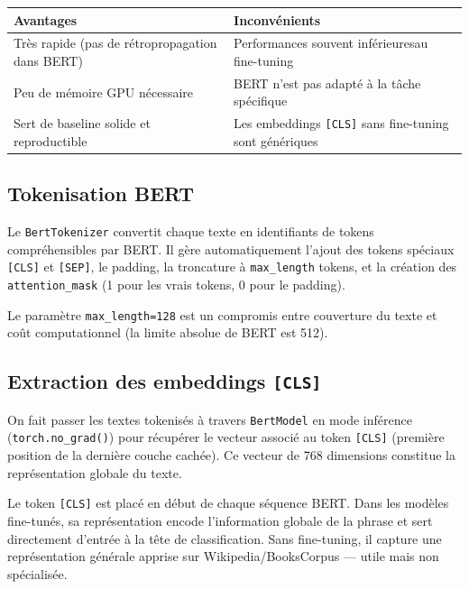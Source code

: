 \documentclass[12pt,a4paper]{article}
\begin{document}
\begin{center}
\begin{tabular}{@{}L{7.5cm}L{7.5cm}@{}}
  \toprule
  Avantages & Inconvénients \\
  \midrule
  Très rapide (pas de rétropropagation dans BERT) & Performances souvent inférieures\newline au fine-tuning \\
  Peu de mémoire GPU nécessaire & BERT n'est pas adapté à la tâche spécifique \\
  Sert de baseline solide et reproductible & Les embeddings \texttt{[CLS]} sans fine-tuning sont génériques \\
  \bottomrule
\end{tabular}
\end{center}

\subsection{Tokenisation BERT}

Le \texttt{BertTokenizer} convertit chaque texte en identifiants de tokens compréhensibles
par BERT. Il gère automatiquement l'ajout des tokens spéciaux \texttt{[CLS]} et
\texttt{[SEP]}, le padding, la troncature à \texttt{max\_length} tokens, et la création des
\texttt{attention\_mask} (1 pour les vrais tokens, 0 pour le padding).

Le paramètre \texttt{max\_length=128} est un compromis entre couverture du texte et coût
computationnel (la limite absolue de BERT est 512).

\subsection{Extraction des embeddings \texttt{[CLS]}}

On fait passer les textes tokenisés à travers \texttt{BertModel} en mode inférence \newline
(\texttt{torch.no\_grad()}) pour récupérer le vecteur associé au token \texttt{[CLS]}
(première position de la dernière couche cachée). Ce vecteur de 768 dimensions constitue
la représentation globale du texte.

\begin{tipbox}
Le token \texttt{[CLS]} est placé en début de chaque séquence BERT. Dans les modèles
fine-tunés, sa représentation encode l'information globale de la phrase et sert
directement d'entrée à la tête de classification. Sans fine-tuning, il capture une
représentation générale apprise sur Wikipedia/BooksCorpus — utile mais non spécialisée.
\end{tipbox}
\end{document}
